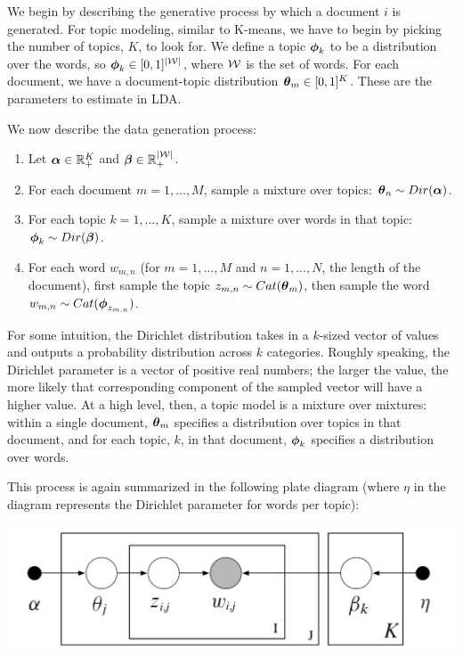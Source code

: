 \documentclass[12pt,letterpaper]{article}
\begin{document}
We begin by describing the generative process by which a document $i$ is generated. For topic modeling, similar to K-means, we have to begin by picking the number of topics, $K$, to look for. We define a topic $\boldsymbol{\phi}_{k}$ to be a distribution over the words, so $\boldsymbol{\phi}_{k} \in [0,1]^{|\mathcal{W}|}$, where $\mathcal{W}$ is the set of words. For each document, we have a document-topic distribution $\boldsymbol{\theta}_m \in [0,1]^K$. These are the parameters to estimate in LDA.

We now describe the data generation process:

\begin{enumerate}
    \item Let $\boldsymbol{\alpha} \in \mathbb{R}_+^K$ and $\boldsymbol{\beta} \in \mathbb{R}_+^{|\mathcal{W}|}$.
    \item For each document $m = 1, \ldots, M$, sample a mixture over topics: $\boldsymbol{\theta}_n \sim Dir(\boldsymbol{\alpha})$.
    \item For each topic $k = 1, \ldots, K$, sample a mixture over words in that topic: $\boldsymbol{\phi}_k \sim Dir(\boldsymbol{\beta})$.
    \item For each word $w_{m,n}$ (for $m = 1, \ldots, M$ and $n = 1, \ldots, N$, the length of the document), first sample the topic $z_{m,n} \sim Cat(\boldsymbol{\theta}_m)$, then sample the word $w_{m,n} \sim Cat(\boldsymbol{\phi}_{z_{m,n}})$.
\end{enumerate}

\noindent For some intuition, the Dirichlet distribution takes in a $k$-sized vector of values and outputs a probability distribution across $k$ categories. Roughly speaking, the Dirichlet parameter is a vector of positive real numbers; the larger the value, the more likely that corresponding component of the sampled vector will have a higher value. At a high level, then, a topic model is a mixture over mixtures: within a single document, $\boldsymbol{\theta}_m$ specifies a distribution over topics in that document, and for each topic, $k$, in that document, $\boldsymbol{\phi}_k$ specifies a distribution over words.

This process is again summarized in the following plate diagram (where $\eta$ in the diagram represents the Dirichlet parameter for words per topic):

\begin{center}
\includegraphics[scale= 0.6]{LDA.png}
\end{center}
\end{document}
